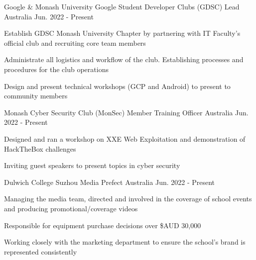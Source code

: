 

\begin{cventries}

    \cventry
    {Google \& Monash University} %
    {Google Student Developer Clubs (GDSC) Lead} %
    {Australia} %
    {Jun. 2022 - Present} %
    {
        \begin{cvitems} %
            \item {Establish GDSC Monash University Chapter by partnering with IT Faculty's official club and recruiting core team members}
            \item {Administrate all logistics and workflow of the club. Establishing processes and procedures for the club operations}
            \item {Design and present technical workshops (GCP and Android) to present to community members}
        \end{cvitems}
    }

    \cventry
    {Monash Cyber Security Club (MonSec)} %
    {Member Training Officer} %
    {Australia} %
    {Jun. 2022 - Present} %
    {
        \begin{cvitems} %
            \item {Designed and ran a workshop on XXE Web Exploitation and demonstration of HackTheBox challenges}
            \item {Inviting guest speakers to present topics in cyber security}
        \end{cvitems}
    }


    \cventry
    {Dulwich College Suzhou} %
    {Media Prefect} %
    {Australia} %
    {Jun. 2022 - Present} %
    {
        \begin{cvitems} %
            \item {Managing the media team, directed and involved in the coverage of school events and producing promotional/coverage videos}
            \item {Responsible for equipment purchase decisions over \$AUD 30,000}
            \item {Working closely with the marketing department to ensure the school's brand is represented consistently}
        \end{cvitems}
    }



\end{cventries}
